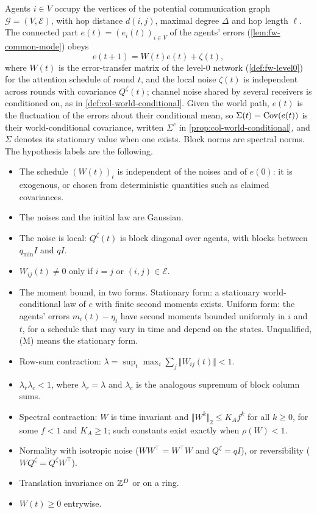 \begin{assumption}\label{asm:sca-standing}
Agents $i\in V$ occupy the vertices of the potential communication graph $\mathcal G=(V,\mathcal E)$, with hop distance $d(i,j)$, maximal degree $\Delta$ and hop length $\ell$. The connected part $e(t)=(e_i(t))_{i\in V}$ of the agents' errors (\cref{lem:fw-common-mode}) obeys
\begin{equation}\label{eq:sca-recursion}
e(t+1)=W(t)e(t)+\zeta(t),
\end{equation}
where $W(t)$ is the error-transfer matrix of the level-0 network (\cref{def:fw-level0}) for the attention schedule of round $t$, and the local noise $\zeta(t)$ is independent across rounds with covariance $Q^\zeta(t)$; channel noise shared by several receivers is conditioned on, as in \cref{def:col-world-conditional}. Given the world path, $e(t)$ is the fluctuation of the errors about their conditional mean, so $\Sigma(t)=\operatorname{Cov}(e(t))$ is their world-conditional covariance, written $\Sigma^c$ in \cref{prop:col-world-conditional}, and $\Sigma$ denotes its stationary value when one exists. Block norms are spectral norms. The hypothesis labels are the following.
\begin{itemize}
\item[\textup{(Lin)}] The schedule $(W(t))_t$ is independent of the noises and of $e(0)$: it is exogenous, or chosen from deterministic quantities such as claimed covariances.
\item[\textup{(G)}] The noises and the initial law are Gaussian.
\item[\textup{(B)}] The noise is local: $Q^\zeta(t)$ is block diagonal over agents, with blocks between $q_{\min}I$ and $qI$.
\item[\textup{(Loc)}] $W_{ij}(t)\neq0$ only if $i=j$ or $(i,j)\in\mathcal E$.
\item[\textup{(M)}] The moment bound, in two forms. Stationary form: a stationary world-conditional law of $e$ with finite second moments exists. Uniform form: the agents' errors $m_i(t)-\eta_t$ have second moments bounded uniformly in $i$ and $t$, for a schedule that may vary in time and depend on the states. Unqualified, \textup{(M)} means the stationary form.
\item[\textup{(C$_r$)}] Row-sum contraction: $\lambda=\sup_t\max_i\sum_j\Vert W_{ij}(t)\Vert<1$.
\item[\textup{(C$_{rc}$)}] $\lambda_r\lambda_c<1$, where $\lambda_r=\lambda$ and $\lambda_c$ is the analogous supremum of block column sums.
\item[\textup{(C$_\rho$)}] Spectral contraction: $W$ is time invariant and $\Vert W^k\Vert_2\le K_Af^k$ for all $k\ge0$, for some $f<1$ and $K_A\ge1$; such constants exist exactly when $\rho(W)<1$.
\item[\textup{(N)}] Normality with isotropic noise ($WW^\top=W^\top W$ and $Q^\zeta=qI$), or reversibility ($WQ^\zeta=Q^\zeta W^\top$).
\item[\textup{(TI)}] Translation invariance on $\mathbb{Z}^D$ or on a ring.
\item[\textup{(NN)}] $W(t)\ge0$ entrywise.
\end{itemize}
\end{assumption}
